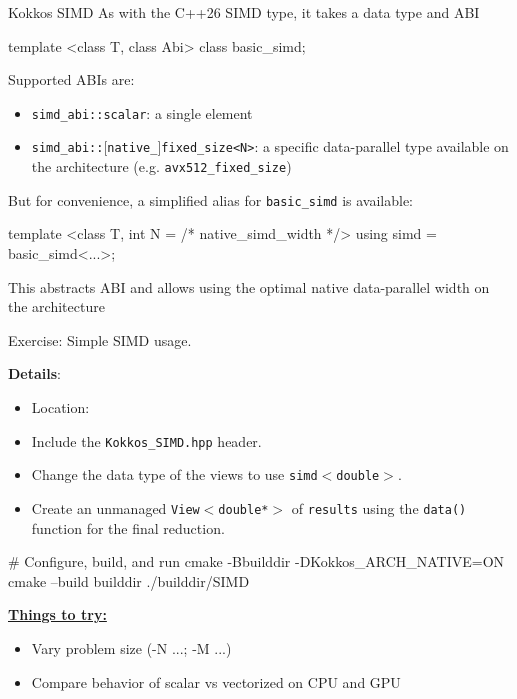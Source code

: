 \begin{frame}[fragile]{Kokkos SIMD}
  As with the C++26 SIMD type, it takes a data type and ABI
  \begin{code}
     template <class T, class Abi>
     class basic_simd;
  \end{code}

  Supported ABIs are:
  \begin{itemize}
    \item \texttt{simd\_abi::scalar}: a single element
    \item \texttt{simd\_abi::$[$native\_$]$fixed\_size<N>}: a specific data-parallel type available on the architecture (e.g. \texttt{avx512\_fixed\_size})
  \end{itemize}

  But for convenience, a simplified alias for \texttt{basic\_simd} is available:
  \begin{code}
    template <class T, int N = /* native_simd_width */>
    using simd = basic_simd<...>;
  \end{code}

  This abstracts ABI and allows using the optimal native data-parallel width on the architecture

\end{frame}

\begin{frame}[fragile]{Exercise: Simple SIMD usage.}

  \textbf{Details}:
  \begin{small}
  \begin{itemize}
\item Location: 
\item Include the \texttt{Kokkos\_SIMD.hpp} header.
\item Change the data type of the views to use \texttt{simd$<$double$>$}.
\item Create an unmanaged \texttt{View$<$double*$>$} of \texttt{results} using the \texttt{data()} function for the final reduction.  
\end{itemize}
  \end{small}

\begin{code}
  # Configure, build, and run
    cmake -Bbuilddir -DKokkos_ARCH_NATIVE=ON
    cmake --build builddir
    ./builddir/SIMD
\end{code}

	\vspace{-3pt}
\ul{\textbf{Things to try:}}
  \begin{small}
  \begin{itemize}
  \item Vary problem size (-N ...; -M ...)
  \item Compare behavior of scalar vs vectorized on CPU and GPU
  \end{itemize}
  \end{small}



\end{frame}

